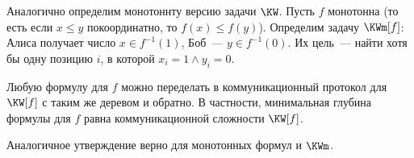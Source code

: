 Аналогично определим монотоннту версию задачи $\KW$. Пусть $f$ монотонна (то есть если $x \le y$
покоординатно, то $f(x) \le f(y)$). Определим задачу $\KWm[f]$: Алиса получает число $x \in f^{-1}(1)$,
Боб~--- $y \in f^{-1}(0)$. Их цель~--- найти хотя бы одну позицию $i$, в которой $x_i = 1 \land y_i = 0$.

\begin{theorem}
    \label{th:KW-theorem}
    Любую формулу для $f$ можно переделать в коммуникационный протокол для $\KW[f]$ с таким же деревом и
    обратно. В частности, минимальная глубина формулы для $f$ равна коммуникационной сложности $\KW[f]$.

    Аналогичное утверждение верно для монотонных формул и $\KWm$.
\end{theorem}

